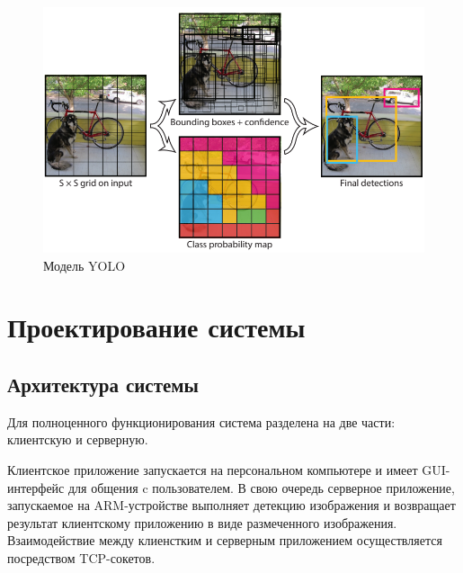 \documentclass[a4paper,english,russian]{G2-105}
\begin{document}
\begin{figure}
\begin{center}
    \includegraphics[width=0.7\linewidth]{yoloiter.png}
    \caption{Модель YOLO}
	\label{yoloiter}
\end{center}
\end{figure} 


\chapter{Проектирование системы}
\section{Архитектура системы}
\par Для полноценного функционирования система разделена на две части: клиентскую и серверную.
\par Клиентское приложение запускается на персональном компьютере и имеет GUI-интерфейс для общения c пользователем. В свою очередь серверное приложение, запускаемое на ARM-устройстве выполняет детекцию изображения и возвращает результат клиентскому приложению в виде размеченного изображения. Взаимодействие между клиенстким и серверным приложением осуществляется посредством TCP-сокетов.
\ttl
\end{document}
